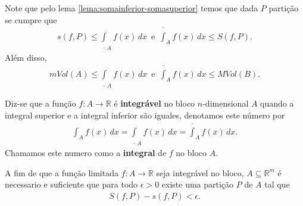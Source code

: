 \begin{note}
  Note que pelo lema \ref{lema:somainferior-somasuperior} temos que dada $P$ partição se cumpre que
  \begin{align*}
    s(f,P)\leq \underline{\int}_{A}f(x)\,dx\,\text{ e }\,\overline{\int}_{A}f(x)\,dx\leq S(f,P).
  \end{align*}
  Além disso,
  \begin{align*} 
    mVol(A)\leq \underline{\int}_{A}f(x)\,dx\,\text{ e }\,\overline{\int}_{A}f(x)\,dx\leq MVol(B).
  \end{align*}
\end{note}
\begin{definition}[Integral]
  Diz-se que a função $f:A\to\mathbb{R}$ é \textbf{integrável} no bloco $n$-dimensional $A$ quando a integral superior e a integral inferior são iguales, denotamos este número por
  \begin{align*}
    \int_{A}f(x)\,dx=\underline{\int}_{A}f(x)\,dx=\overline{\int}_{A}f(x)\,dx.
  \end{align*}
  Chamamos este numero como a \textbf{integral} de $f$ no bloco $A$. 
\end{definition}
\begin{theorem}
  A fim de que a função limitada $f:A\to\mathbb{R}$ seja integrável no bloco, $A\subseteq\mathbb{R}^{m}$ é necessario e suficiente que para todo $\epsilon>0$ existe uma partição $P$ de $A$ tal que
  \begin{align*}
    S(f,P)-s(f,P)<\epsilon.
  \end{align*}
\end{theorem}
